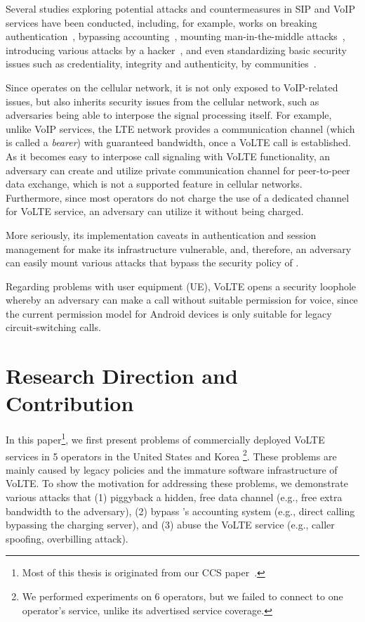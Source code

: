 Several studies exploring potential attacks and countermeasures in SIP and VoIP services have been conducted, including, for example,
works on breaking authentication~\cite{beekman2013breaking},
bypassing accounting~\cite{zhang2007billing},
mounting man-in-the-middle attacks~\cite{zhang2009feasibility},
introducing various attacks by a hacker~\cite{ozavci2013voip},
and even standardizing basic security issues such as
credentiality, integrity and authenticity, by communities~\cite{3gpp_access_sec, 3gpp_net_sec, arkko2003security, wang2008ims}.

Since \vt operates on the cellular network,
it is not only exposed to VoIP-related issues,
but also inherits security issues from the cellular network, such
as adversaries being able to interpose the signal processing itself.
%
For example, unlike VoIP services, the LTE network provides a communication
channel (which is called a {\it bearer}) with guaranteed bandwidth, once
a VoLTE call is established. As it becomes easy to interpose call
signaling with VoLTE functionality, an adversary can create and
utilize private communication channel for peer-to-peer data exchange,
which is not a supported feature in cellular networks. Furthermore,
since most operators do not charge the use of a dedicated channel for
VoLTE service, an adversary can utilize it without being charged.


More seriously, its implementation caveats in authentication and
session management for \vt make its infrastructure vulnerable, and,
therefore, an adversary can easily mount various attacks that bypass
the security policy of \vt.

Regarding problems with user equipment (UE), VoLTE opens a
security loophole whereby an adversary can make a call without suitable
permission for voice, since the current permission model for Android
devices is only suitable for legacy circuit-switching calls.


\section{Research Direction and Contribution}
In this paper\footnote{Most of this thesis is originated from our CCS
paper~\cite{kim2015breaking}.}, we first present problems of commercially
deployed VoLTE services in 5 operators in the United States and Korea
\footnote{We performed experiments on 6 operators, but we failed to connect to
one operator's \vt service, unlike its advertised service coverage.}.
%
These problems are mainly caused by legacy policies and the immature software
infrastructure of VoLTE.
%
To show the motivation for addressing these problems, we demonstrate various attacks that
(1) piggyback a hidden, free data channel
(e.g., free extra bandwidth to the adversary),
 (2) bypass \vt's accounting system (e.g., direct calling bypassing the charging server),
and (3) abuse the VoLTE service
(e.g., caller spoofing, overbilling attack).

